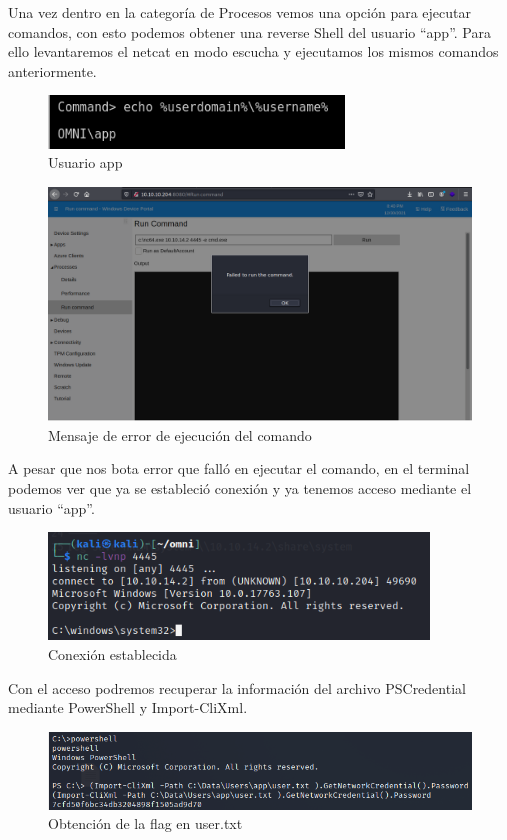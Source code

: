 \documentclass{article}
\begin{document}
Una vez dentro en la categoría de Procesos vemos una opción para ejecutar comandos, con esto podemos obtener una reverse Shell del usuario “app”. Para ello levantaremos el netcat en modo escucha y ejecutamos los mismos comandos anteriormente.
\begin{figure}[H]
	\center
	\includegraphics[width=0.7\textwidth]{images/omni/21.png}
	\caption{Usuario app}
\end{figure}
\begin{figure}[H]
	\center
	\includegraphics[width=\textwidth]{images/omni/22.png}
	\caption{Mensaje de error de ejecución del comando}
\end{figure}

A pesar que nos bota error que falló en ejecutar el comando, en el terminal podemos ver que ya se estableció conexión y ya tenemos acceso mediante el usuario “app”.
\begin{figure}[H]
	\center
	\includegraphics[width=0.9\textwidth]{images/omni/23.png}
	\caption{Conexión establecida}
\end{figure}

Con el acceso podremos recuperar la información del archivo PSCredential mediante PowerShell y Import-CliXml.
\begin{figure}[H]
	\center
	\includegraphics[width=\textwidth]{images/omni/24.png}
	\caption{Obtención de la flag en user.txt}
\end{figure}
\end{document}
